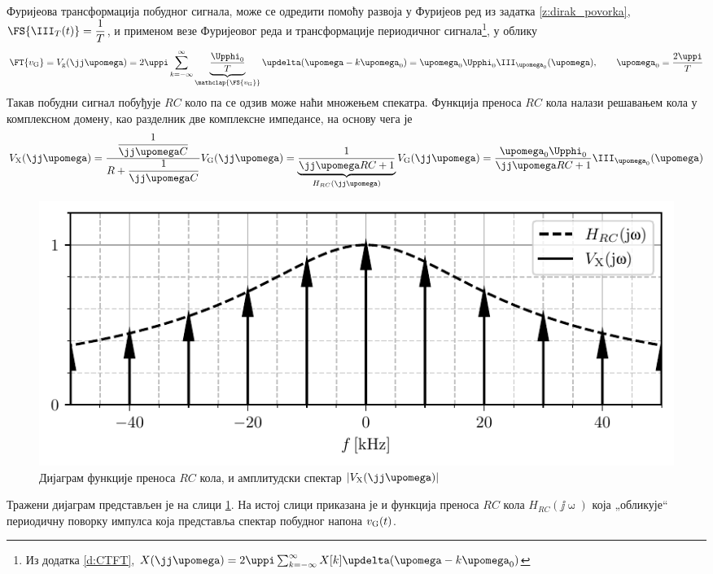 Фуријеова трансформација побудног сигнала, може се одредити помоћу развоја у Фуријеов ред из
задатка \ref{z:dirak_povorka}, $\FS{\III_T(t)} = \dfrac{1}{T}$, и применом везе Фуријеовог  
реда и трансформације периодичног сигнала\footnote{Из додатка
\ref{d:CTFT}, 
$
X(\jj\upomega) = 2\uppi \sum_{k = -\infty}^{\infty} X[k] \updelta( \upomega - k \upomega_{\rm 0} )
$
}, у облику 
\begin{equation}
    \FT{v_{\rm G}} = V_{\rm g}(\jj\upomega) = 2\uppi  \sum_{k = -\infty}^{\infty} \underbrace{\dfrac{\Upphi_0}{T}}_{\mathclap{\FS{v_{\rm G}}}} \updelta( \upomega - k \upomega_{\rm 0} )
    = {\upomega_0 \Upphi_0}\III_{\upomega_0}(\upomega), \qquad \upomega_0 = \dfrac{2\uppi}{T}
\end{equation}
Такав побудни сигнал побуђује $RC$ коло па се одзив може наћи множењем спекатра. 
Функција преноса $RC$ кола налази решавањем кола у комплексном домену, 
као разделник две комплексне импедансе, на основу чега је  
\begin{eqnarray}
    V_{\rm X}(\jj\upomega) = \dfrac{ \dfrac{1}{\jj\upomega C} }{ R + \dfrac{1}{\jj\upomega C} } V_{\rm G}(\jj\upomega)
                           = \underbrace{\dfrac{ 1 }{ \jj\upomega RC + 1 }}_{H_{RC}(\jj\upomega)} V_{\rm G}(\jj\upomega)
                           = \dfrac{ {\upomega_0 \Upphi_0} }{ \jj\upomega RC + 1 } \III_{\upomega_0}(\upomega)
\end{eqnarray}
%
\begin{figure}
    \centering
    \includegraphics{fig/comb_snaga_result.pdf}
    \caption{Дијаграм функције преноса $RC$ кола, и амплитудски спектар $|V_{\rm X}(\jj\upomega)|$ }
    \label{fig:\ID.vx}
\end{figure}
%
Тражени дијаграм представљен је на слици \ref{fig:\ID.vx}. На истој слици приказана је и функција преноса $RC$ кола
$H_{RC}(\jj\upomega)$ која „обликује“ периодичну поворку импулса која представља спектар побудног напона $v_{\rm G}(t)$.

